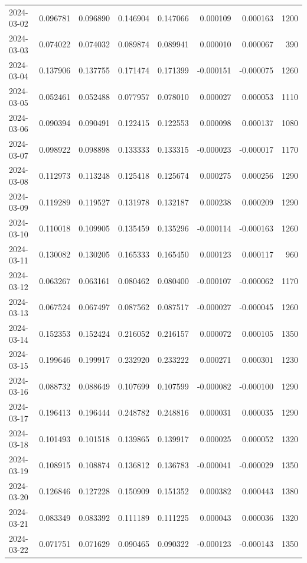 \begin{tabular}{lrrrrrrr}
2024-03-02 & 0.096781 & 0.096890 & 0.146904 & 0.147066 & 0.000109 & 0.000163 & 1200 \\
2024-03-03 & 0.074022 & 0.074032 & 0.089874 & 0.089941 & 0.000010 & 0.000067 & 390 \\
2024-03-04 & 0.137906 & 0.137755 & 0.171474 & 0.171399 & -0.000151 & -0.000075 & 1260 \\
2024-03-05 & 0.052461 & 0.052488 & 0.077957 & 0.078010 & 0.000027 & 0.000053 & 1110 \\
2024-03-06 & 0.090394 & 0.090491 & 0.122415 & 0.122553 & 0.000098 & 0.000137 & 1080 \\
2024-03-07 & 0.098922 & 0.098898 & 0.133333 & 0.133315 & -0.000023 & -0.000017 & 1170 \\
2024-03-08 & 0.112973 & 0.113248 & 0.125418 & 0.125674 & 0.000275 & 0.000256 & 1290 \\
2024-03-09 & 0.119289 & 0.119527 & 0.131978 & 0.132187 & 0.000238 & 0.000209 & 1290 \\
2024-03-10 & 0.110018 & 0.109905 & 0.135459 & 0.135296 & -0.000114 & -0.000163 & 1260 \\
2024-03-11 & 0.130082 & 0.130205 & 0.165333 & 0.165450 & 0.000123 & 0.000117 & 960 \\
2024-03-12 & 0.063267 & 0.063161 & 0.080462 & 0.080400 & -0.000107 & -0.000062 & 1170 \\
2024-03-13 & 0.067524 & 0.067497 & 0.087562 & 0.087517 & -0.000027 & -0.000045 & 1260 \\
2024-03-14 & 0.152353 & 0.152424 & 0.216052 & 0.216157 & 0.000072 & 0.000105 & 1350 \\
2024-03-15 & 0.199646 & 0.199917 & 0.232920 & 0.233222 & 0.000271 & 0.000301 & 1230 \\
2024-03-16 & 0.088732 & 0.088649 & 0.107699 & 0.107599 & -0.000082 & -0.000100 & 1290 \\
2024-03-17 & 0.196413 & 0.196444 & 0.248782 & 0.248816 & 0.000031 & 0.000035 & 1290 \\
2024-03-18 & 0.101493 & 0.101518 & 0.139865 & 0.139917 & 0.000025 & 0.000052 & 1320 \\
2024-03-19 & 0.108915 & 0.108874 & 0.136812 & 0.136783 & -0.000041 & -0.000029 & 1350 \\
2024-03-20 & 0.126846 & 0.127228 & 0.150909 & 0.151352 & 0.000382 & 0.000443 & 1380 \\
2024-03-21 & 0.083349 & 0.083392 & 0.111189 & 0.111225 & 0.000043 & 0.000036 & 1320 \\
2024-03-22 & 0.071751 & 0.071629 & 0.090465 & 0.090322 & -0.000123 & -0.000143 & 1350 \\

\end{tabular}
